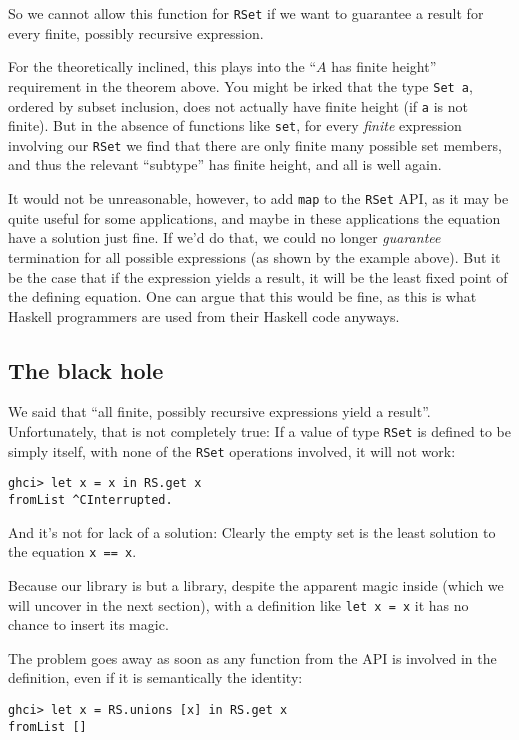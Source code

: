 \documentclass[manuscript,screen,acmsmall]{acmart}
\begin{document}
So we cannot allow this function for \verb|RSet| if we want to guarantee a result for every finite, possibly recursive expression.

For the theoretically inclined, this plays into the “$A$ has finite height” requirement in the theorem above. You might be irked that the type \verb|Set a|, ordered by subset inclusion, does not actually have finite height (if \verb|a| is not finite). But in the absence of functions like \verb|set|, for every \emph{finite} expression involving our \verb|RSet| we find that there are only finite many possible set members, and thus the relevant “subtype” has finite height, and all is well again.

It would not be unreasonable, however, to add \verb|map| to the \verb|RSet| API, as it may be quite useful for some applications, and maybe in these applications the equation have a solution just fine. If we'd do that, we could no longer \emph{guarantee} termination for all possible expressions (as shown by the example above). But it be the case that if the expression yields a result, it will be the least fixed point of the defining equation. One can argue that this would be fine, as this is what Haskell programmers are used from their Haskell code anyways.

\subsection{The black hole}\label{sec:blackhole}

We said that “all finite, possibly recursive expressions yield a result”. Unfortunately, that is not completely true: If a value of type \verb|RSet| is defined to be simply itself, with none of the \verb|RSet| operations involved, it will not work:
\begin{verbatim}
ghci> let x = x in RS.get x
fromList ^CInterrupted.
\end{verbatim}
And it’s not for lack of a solution: Clearly the empty set is the least solution to the equation \verb|x == x|.

Because our library is but a library, despite the apparent magic inside (which we will uncover in the next section), with a definition like \verb|let x = x| it has no chance to insert its magic.

The problem goes away as soon as any function from the API is involved in the definition, even if it is semantically the identity:
\begin{verbatim}
ghci> let x = RS.unions [x] in RS.get x
fromList []
\end{verbatim}
\end{document}
